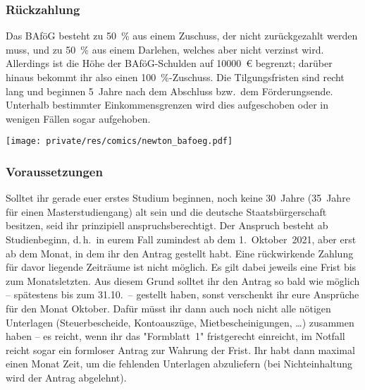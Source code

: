 \begin{multicols*}{2}
\subsubsection{Rückzahlung}
Das BAföG besteht zu \SI{50}{\percent} aus einem Zuschuss, der nicht zurückgezahlt werden muss, und zu \SI{50}{\percent} aus einem Darlehen, welches aber nicht verzinst wird.
Allerdings ist die Höhe der BAföG-Schulden auf \SI{10000}{\euro} begrenzt; darüber hinaus bekommt ihr also einen \SI{100}{\percent}-Zuschuss.
Die Tilgungsfristen sind recht lang und beginnen 5~Jahre nach dem Abschluss bzw.\ dem Förderungsende.
Unterhalb bestimmter Einkommensgrenzen wird dies aufgeschoben oder in wenigen Fällen sogar aufgehoben.

\begin{center}
	\texttt{[image: private/res/comics/newton\_bafoeg.pdf]}
\end{center}

\subsubsection{Voraussetzungen}
Solltet ihr gerade euer erstes Studium beginnen, noch keine 30~Jahre (35~Jahre für einen Masterstudiengang) alt sein und die deutsche Staatsbürgerschaft besitzen, seid ihr prinzipiell anspruchsberechtigt.
Der Anspruch besteht ab Studienbeginn, d.\,h.\ in eurem Fall zumindest ab dem 1.~Oktober~2021, aber erst ab dem Monat, in dem ihr den Antrag gestellt habt.
Eine rückwirkende Zahlung für davor liegende Zeiträume ist nicht möglich.
Es gilt dabei jeweils eine Frist bis zum Monatsletzten.
Aus diesem Grund solltet ihr den Antrag so bald wie möglich -- spätestens bis zum 31.10.\ -- gestellt haben, sonst verschenkt ihr eure Ansprüche für den Monat Oktober.
Dafür müsst ihr dann auch noch nicht alle nötigen Unterlagen (Steuerbescheide, Kontoauszüge, Mietbescheinigungen, \dots) zusammen haben -- es reicht, wenn ihr das "Formblatt~1" fristgerecht einreicht, im Notfall reicht sogar ein formloser Antrag zur Wahrung der Frist.
Ihr habt dann maximal einen Monat Zeit, um die fehlenden Unterlagen abzuliefern (bei Nichteinhaltung wird der Antrag abgelehnt).


\end{multicols*}
